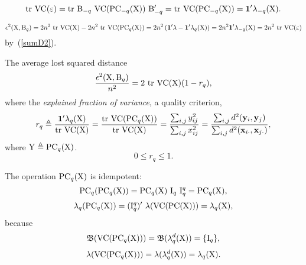 \documentclass[10pt,a4paper]{article}
\theoremstyle{plain} \newtheorem{Lem}{Lemma}
\begin{document}
$$ \mathrm {tr} \  \mathrm {VC} (\mathrm \varepsilon) = \mathrm {tr} \  \mathrm B_{-q} \ \mathrm {VC}(\mathrm {PC}_{-q}(\mathrm X)) \ \mathrm B_{-q}' = \mathrm {tr} \  \mathrm {VC}(\mathrm {PC}_{-q}(\mathrm X)) = \mathbf 1' \mathbf \lambda_{-q}(\mathrm X). $$

$$ \epsilon^2(\mat X, \mat B_q) = 2n^2 \ \trc \VC (\mat X) - 2n^2 \ \trc \VC (\PC_q(\mat X)) 
  = 2n^2 \left(\ve 1' \ve \lambda - \ve 1' \ve \lambda_q(\mat X) \right) 
  = 2n^2 \ve 1' \ve \lambda_{-q}(\mat X) 
  = 2n^2 \ \trc \VC (\mat \varepsilon)
$$
by~(\ref{sumD2}).

The average lost squared distance 
$$ \frac {\epsilon^2(\mathrm X, \mathrm B_q)} {n^2} = 2 \ \mathrm {tr} \  \mathrm {VC} (\mathrm X) (1 - r_q), $$
where the {\em explained fraction of variance}, a quality criterion,
\begin{equation}\label{explFracVar}
r_q \triangleq \frac {\mathbf 1' \mathbf \lambda_q(\mathrm X)} {\mathrm {tr} \  \mathrm {VC} (\mathrm X)} 
  = \frac {\mathrm {tr} \  \mathrm {VC} (\mathrm {PC}_q(\mathrm X))} {\mathrm {tr} \  \mathrm {VC} (\mathrm X)}
  = \frac {\sum_{i,j} y^2_{ij}} {\sum_{i,j} x^2_{ij}}
  = \frac {\sum_{i,j} d^2(\mathbf y_i, \mathbf y_j)} {\sum_{i,j} d^2(\mathbf x_{i\cdot}, \mathbf x_{j\cdot})},
\end{equation}
where $\mathrm Y \triangleq \mathrm {PC}_q(\mathrm X)$.
$$ 0 \le r_q \le 1. $$


The operation $\mathrm {PC}_q(\mathrm X)$ is idempotent:
$$ \mathrm {PC}_q(\mathrm {PC}_q(\mathrm X)) = \mathrm {PC}_q (\mathrm X) \ \mathrm I_q \ \mathrm I^q_q = \mathrm {PC}_q(\mathrm X), $$
$$ \ve \lambda_q (\PC_q(\mat X)) = (\mat I^q_q)' \ \ve \lambda(\VC(\PC(\mat X))) = \ve \lambda_q(\mat X), $$
because
$$ \mathfrak B(\mathrm {VC}(\mathrm {PC}_q(\mathrm X))) = \mathfrak B(\mathbf \lambda_q^d(\mathrm X)) = \{\mathrm I_q \}, $$
$$ \mathbf \lambda(\mathrm {VC}(\mathrm {PC}_q(\mathrm X))) =  \mathbf \lambda(\mathbf \lambda_q^d(\mathrm X)) = \mathbf \lambda_q(\mathrm X). $$
\end{document}

